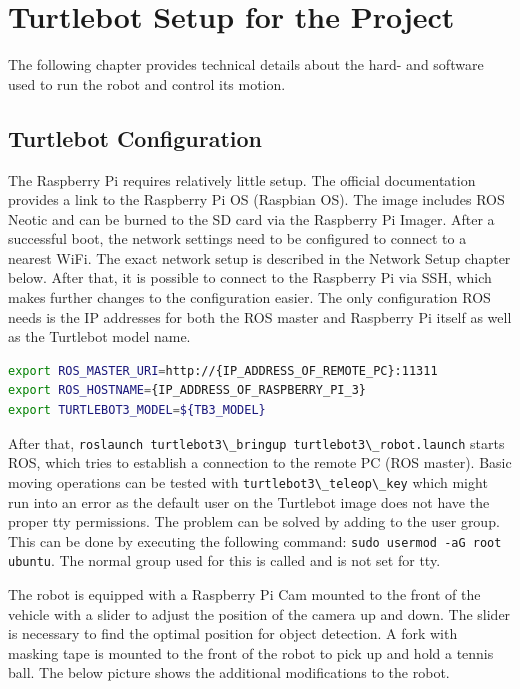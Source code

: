 \section{Turtlebot Setup for the Project}

The following chapter provides technical details about the hard- and software used to run the robot and control its motion.

\subsection{Turtlebot Configuration}

The Raspberry Pi requires relatively little setup. The official documentation provides a link to the Raspberry Pi \ac{OS} (Raspbian OS). The image includes \ac{ROS} Neotic and can be burned to the SD card via the Raspberry Pi Imager. After a successful boot, the network settings need to be configured to connect to a nearest WiFi. The exact network setup is described in the Network Setup chapter below. After that, it is possible to connect to the Raspberry Pi via \ac{SSH}, which makes further changes to the configuration easier.
The only configuration ROS needs is the IP addresses for both the ROS master and Raspberry Pi itself as well as the Turtlebot model name.

{\scriptsize
\begin{lstlisting}[language=sh,frame=single,caption=Environment Variables,label=code:env]
export ROS_MASTER_URI=http://{IP_ADDRESS_OF_REMOTE_PC}:11311
export ROS_HOSTNAME={IP_ADDRESS_OF_RASPBERRY_PI_3}
export TURTLEBOT3_MODEL=${TB3_MODEL}
\end{lstlisting}}

After that, \lstinline|roslaunch turtlebot3\_bringup turtlebot3\_robot.launch| starts \ac{ROS}, which tries to establish a connection to the remote PC (ROS master). Basic moving operations can be tested with \lstinline|turtlebot3\_teleop\_key| which might run into an error as the default user  on the Turtlebot image does not have the proper \ac{tty} permissions. The problem can be solved by adding  to the  user group. This can be done by executing the following command: \lstinline|sudo usermod -aG root ubuntu|. The normal group used for this is called  and is not set for \ac{tty}.

The robot is equipped with a Raspberry Pi Cam mounted to the front of the vehicle with a slider to adjust the position of the camera up and down. The slider is necessary to find the optimal position for object detection. A fork with masking tape is mounted to the front of the robot to pick up and hold a tennis ball. The below picture shows the additional modifications to the robot.

